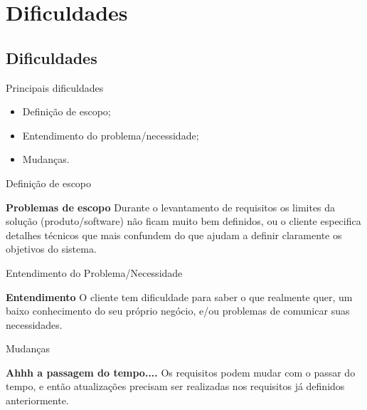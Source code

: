 \documentclass[xcolor=x11names,compress]{beamer}
\begin{document}
\section{Dificuldades}
\subsection{Dificuldades}

\begin{frame}{Principais dificuldades}

\begin{itemize}
\itemsep 5mm

\item Definição de escopo;

\item Entendimento do problema/necessidade;

\item Mudanças.

\end{itemize}

\end{frame}

\begin{frame}{Definição de escopo}

\begin{alertblock}{\textbf{Problemas de escopo}}
Durante o levantamento de requisitos os limites da solução (produto/software) não ficam muito bem definidos, ou o cliente especifica detalhes técnicos que mais confundem do que ajudam a definir claramente os objetivos do sistema.
\end{alertblock}

\end{frame}

\begin{frame}{Entendimento do Problema/Necessidade}

\begin{alertblock}{\textbf{Entendimento}}
O cliente tem dificuldade para saber o que realmente quer, um baixo conhecimento do seu próprio negócio, e/ou problemas de comunicar suas necessidades. 
\end{alertblock}

\end{frame}

\begin{frame}{Mudanças}

\begin{alertblock}{\textbf{Ahhh a passagem do tempo....}}
Os requisitos podem mudar com o passar do tempo, e então atualizações precisam ser realizadas nos requisitos já definidos anteriormente.
\end{alertblock}

\end{frame}
\end{document}
